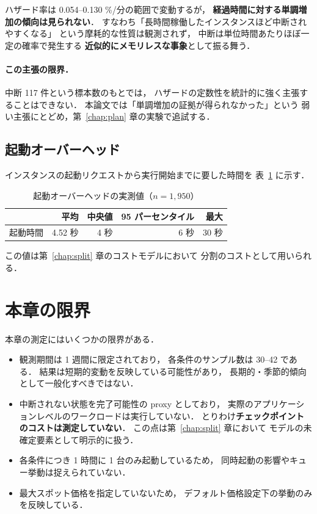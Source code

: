 \documentclass[11pt,a4paper]{ltjsreport}
\begin{document}
ハザード率は 0.054--0.130 \%/分の範囲で変動するが，
\textbf{経過時間に対する単調増加の傾向は見られない}．
すなわち「長時間稼働したインスタンスほど中断されやすくなる」
という摩耗的な性質は観測されず，
中断は単位時間あたりほぼ一定の確率で発生する
\textbf{近似的にメモリレスな事象}として振る舞う．

\paragraph{この主張の限界．}
中断 117 件という標本数のもとでは，
ハザードの定数性を統計的に強く主張することはできない．
本論文では「単調増加の証拠が得られなかった」という
弱い主張にとどめ，第~\ref{chap:plan} 章の実験で追試する．

\subsection{起動オーバーヘッド}

インスタンスの起動リクエストから実行開始までに要した時間を
表~\ref{tab:startup} に示す．

\begin{table}[htbp]
\centering
\caption{起動オーバーヘッドの実測値（$n = 1{,}950$）}
\label{tab:startup}
\small
\begin{tabular}{@{}lrrrr@{}}
\toprule
 & 平均 & 中央値 & 95 パーセンタイル & 最大 \\
\midrule
起動時間 & 4.52 秒 & 4 秒 & 6 秒 & 30 秒 \\
\bottomrule
\end{tabular}
\end{table}

この値は第~\ref{chap:split} 章のコストモデルにおいて
分割のコストとして用いられる．

\section{本章の限界}
\label{sec:limit_measure}

本章の測定にはいくつかの限界がある．

\begin{itemize}
  \item 観測期間は 1 週間に限定されており，
        各条件のサンプル数は 30--42 である．
        結果は短期的変動を反映している可能性があり，
        長期的・季節的傾向として一般化すべきではない．
  \item 中断されない状態を完了可能性の proxy としており，
        実際のアプリケーションレベルのワークロードは実行していない．
        とりわけ\textbf{チェックポイントのコストは測定していない}．
        この点は第~\ref{chap:split} 章において
        モデルの未確定要素として明示的に扱う．
  \item 各条件につき 1 時間に 1 台のみ起動しているため，
        同時起動の影響やキュー挙動は捉えられていない．
  \item 最大スポット価格を指定していないため，
        デフォルト価格設定下の挙動のみを反映している．
\end{itemize}
\end{document}
